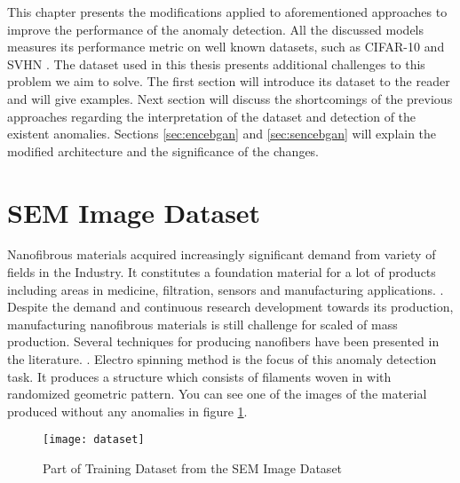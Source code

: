 
\begingroup

This chapter presents the modifications applied to aforementioned approaches to improve the
performance of the anomaly detection. All the discussed models measures its performance metric on
well known datasets, such as CIFAR-10 \cite{cifar10} and SVHN \cite{Netzer2011ReadingDI}. The
dataset used in this thesis presents additional challenges to this problem we aim to solve. The
first section will introduce its dataset to the reader and will give examples. Next section will
discuss the shortcomings of the previous approaches regarding the interpretation of the dataset and
detection of the existent anomalies. Sections \ref{sec:encebgan} and \ref{sec:sencebgan} will
explain the modified architecture and the significance of the changes.

\section{SEM Image Dataset}
\label{sec:sem}

Nanofibrous materials acquired increasingly significant demand from variety of fields in the
Industry. It constitutes a foundation material for a lot of products including areas in medicine,
filtration, sensors and manufacturing applications. \cite{carrera2016defect}. Despite the demand and
continuous research development towards its production, manufacturing nanofibrous materials is still
challenge for scaled of mass production. Several techniques for producing nanofibers have been
presented in the literature. \cite{carrera2016defect}. Electro spinning method is the focus of this
anomaly detection task. It produces a structure which consists of filaments woven in with randomized
geometric pattern. You can see one of the images of the material produced without any anomalies in
figure \ref{fig:data_norm}.

\begin{figure}[h!]
	\centering
	\texttt{[image: dataset]}
	\caption{Part of Training Dataset from the SEM Image Dataset \cite{sem}}
	\label{fig:data_norm}
\end{figure}

